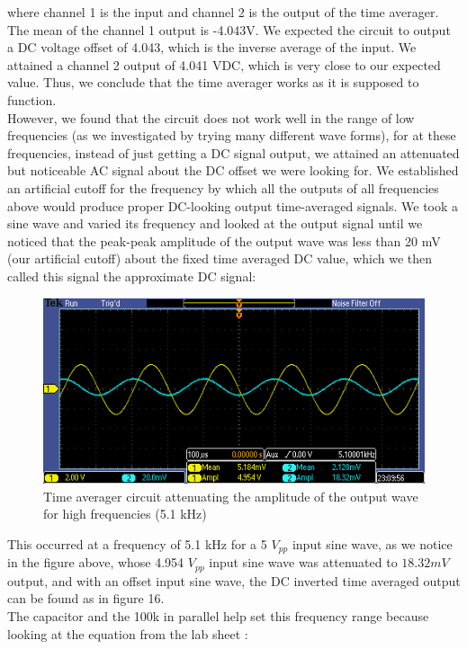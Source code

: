 \documentclass{article}
\begin{document}
    where channel 1 is the input and channel 2 is the output of the time averager. The mean of the channel 1 output is -4.043V. We expected the circuit to output a DC voltage offset of 4.043, which is the inverse average of the input. We attained a channel 2 output of 4.041 VDC, which is very close to our expected value. Thus, we conclude that the time averager works as it is supposed to function.\\\indent 
    However, we found that the circuit does not work well in the range of low frequencies (as we investigated by trying many different wave forms), for at these frequencies, instead of just getting a DC signal output, we attained an attenuated but noticeable AC signal about the DC offset we were looking for. We established an artificial cutoff for the frequency by which all the outputs of all frequencies above would produce proper DC-looking output time-averaged signals. We took a sine wave and varied its frequency and looked at the output signal until we noticed that the peak-peak amplitude of the output wave was less than 20 mV (our artificial cutoff) about the fixed time averaged DC value, which we then called this signal the approximate DC signal: 
    \begin{figure}[H]
        \centering
        \includegraphics[scale = 0.7]{10a.PNG}
        \caption{Time averager circuit attenuating the amplitude of the output wave for high frequencies (5.1 kHz)}
        \label{fig:my_label}
    \end{figure}
    This occurred at a frequency of 5.1 kHz for a 5 $V_{pp}$ input sine wave, as we notice in the figure above, whose 4.954 $V_{pp}$ input sine wave was attenuated to $18.32mV$ output, and with an offset input sine wave, the DC inverted time averaged output can be found as in figure 16.\\\indent 
    The capacitor and the 100k in parallel help set this frequency range because looking at the equation from the lab sheet \cite{lab7}:
\end{document}
